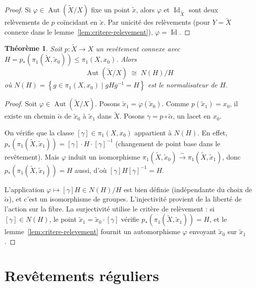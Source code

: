 \documentclass[12pt,a4paper,openany]{book}
\theoremstyle{definition}
\theoremstyle{plain}
\newtheorem{theoreme}[definition]{Théorème}
\theoremstyle{remark}
\DeclareMathOperator{\Aut}{Aut}
\DeclareMathOperator{\Id}{Id}
\newcommand{\set}[1]{\left\{#1\right\}}
\begin{document}
\begin{proof}
Si $\varphi \in \Aut(\widetilde{X}/X)$ fixe un point $\tilde{x}$, alors $\varphi$ et
$\Id_{\widetilde{X}}$ sont deux relèvements de $p$ coïncidant en $\tilde{x}$.
Par unicité des relèvements (pour $Y = \widetilde{X}$ connexe dans le
lemme~\ref{lem:critere-relevement}), $\varphi = \Id$.
\end{proof}

\begin{theoreme}\label{thm:deck-normaliser}
Soit $p \colon \widetilde{X} \to X$ un revêtement connexe avec
$H = p_*(\pi_1(\widetilde{X}, \tilde{x}_0)) \leq \pi_1(X, x_0)$. Alors
\[
\Aut(\widetilde{X}/X) \;\cong\; N(H)/H
\]
où $N(H) = \set{g \in \pi_1(X, x_0) \mid gHg^{-1} = H}$ est le normalisateur de $H$.
\end{theoreme}

\begin{proof}
Soit $\varphi \in \Aut(\widetilde{X}/X)$. Posons $\tilde{x}_1 = \varphi(\tilde{x}_0)$.
Comme $p(\tilde{x}_1) = x_0$, il existe un chemin $\tilde{\alpha}$ de $\tilde{x}_0$ à $\tilde{x}_1$
dans $\widetilde{X}$. Posons $\gamma = p \circ \tilde{\alpha}$, un lacet en $x_0$.

On vérifie que la classe $[\gamma] \in \pi_1(X, x_0)$ appartient à $N(H)$. En effet,
$p_*(\pi_1(\widetilde{X}, \tilde{x}_1)) = [\gamma] \cdot H \cdot [\gamma]^{-1}$
(changement de point base dans le revêtement). Mais $\varphi$ induit un isomorphisme
$\pi_1(\widetilde{X}, \tilde{x}_0) \xrightarrow{\sim} \pi_1(\widetilde{X}, \tilde{x}_1)$,
donc $p_*(\pi_1(\widetilde{X}, \tilde{x}_1)) = H$ aussi, d'où $[\gamma] H [\gamma]^{-1} = H$.

L'application $\varphi \mapsto [\gamma] H \in N(H)/H$ est bien définie
(indépendante du choix de $\tilde{\alpha}$), et c'est un isomorphisme de groupes. L'injectivité
provient de la liberté de l'action sur la fibre. La surjectivité utilise le critère de relèvement :
si $[\gamma] \in N(H)$, le point $\tilde{x}_1 = \tilde{x}_0 \cdot [\gamma]$ vérifie
$p_*(\pi_1(\widetilde{X}, \tilde{x}_1)) = H$, et le lemme~\ref{lem:critere-relevement}
fournit un automorphisme $\varphi$ envoyant $\tilde{x}_0$ sur $\tilde{x}_1$.
\end{proof}

\section{Revêtements réguliers}\label{sec:rev-reguliers}
\end{document}
